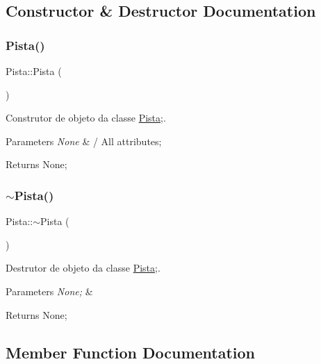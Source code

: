 \subsection{Constructor \& Destructor Documentation}
\mbox{\label{class_pista_a0ac128160ae609df4adcc5a7a41213ba}} 
\subsubsection{\texorpdfstring{Pista()}{Pista()}}
{\footnotesize\ttfamily Pista\+::\+Pista (\begin{DoxyParamCaption}{ }\end{DoxyParamCaption})}



Construtor de objeto da classe \mbox{\hyperlink{class_pista}{Pista}};. 


\begin{DoxyParams}{Parameters}
{\em None} & / All attributes; \\
\hline
\end{DoxyParams}
\begin{DoxyReturn}{Returns}
None; 
\end{DoxyReturn}
\mbox{\label{class_pista_ad6f5c470d1ef5976697058ce42ed26bc}} 
\subsubsection{\texorpdfstring{$\sim$\+Pista()}{~Pista()}}
{\footnotesize\ttfamily Pista\+::$\sim$\+Pista (\begin{DoxyParamCaption}{ }\end{DoxyParamCaption})}



Destrutor de objeto da classe \mbox{\hyperlink{class_pista}{Pista}};. 


\begin{DoxyParams}{Parameters}
{\em None;} & \\
\hline
\end{DoxyParams}
\begin{DoxyReturn}{Returns}
None; 
\end{DoxyReturn}


\subsection{Member Function Documentation}
\mbox{\label{class_pista_aa8cdca9f84ad837b93557fbea30c1dd4}} 
